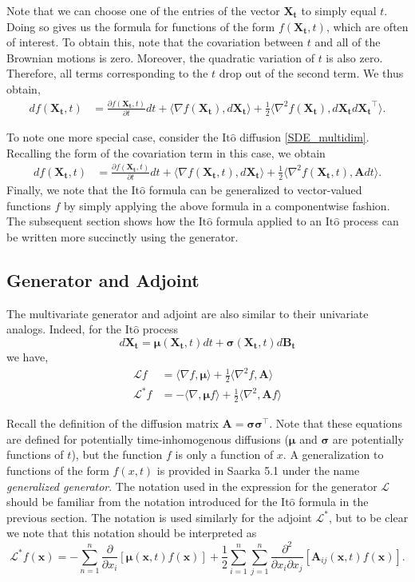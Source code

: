 \documentclass[12pt]{article}
\newcommand{\B}[1]{\boldsymbol{#1}}
\newcommand{\bx}{\mathbf{x}}
\newcommand{\state}[1][t]{X_{#1}}
\newcommand{\BM}[1][t]{B_{#1}} %
\newcommand{\gen}{\mathcal{L}} %
\newcommand{\ito}{\text{It}\hat{\text{o}}}
\newcommand{\dimState}{n}
\newcommand{\diffMat}{\mathbf{A}} %
\begin{document}
Note that we can choose one of the entries of the vector $\B\state$ to simply equal $t$. Doing so gives us the formula for functions of the form $f(\B\state, t)$, which are 
often of interest. To obtain this, note that the covariation between $t$ and all of the Brownian motions is zero. Moreover, the quadratic variation of $t$ is also zero. Therefore, 
all terms corresponding to the $t$ drop out of the second term. We thus obtain, 
\begin{align*}
df(\B\state, t) &= \frac{\partial f(\B\state,t)}{\partial t}dt  + \langle \nabla f(\B\state), d\B\state \rangle + \frac{1}{2} \langle \nabla^2 f(\B\state), d\B\state d\B\state^\top  \rangle.
\end{align*}

To note one more special case, consider the $\ito$ diffusion \ref{SDE_multidim}. Recalling the form of the covariation term in this case, we obtain 
\begin{align*}
df(\B\state, t) &= \frac{\partial f(\B\state,t)}{\partial t}dt + \langle \nabla f(\B\state,t), d\B\state \rangle + \frac{1}{2} \langle \nabla^2 f(\B\state,t), \diffMat dt  \rangle.
\end{align*}
Finally, we note that the $\ito$ formula can be generalized to vector-valued functions $f$ by simply applying the above formula in a componentwise fashion. The subsequent 
section shows how the $\ito$ formula applied to an $\ito$ process can be written more succinctly using the generator. 

\subsection{Generator and Adjoint}
The multivariate generator and adjoint are also similar to their univariate analogs. Indeed, for the $\ito$ process 
\[
d\B\state = \B\mu(\B\state,t) dt + \B\sigma(\B\state,t) d\B\BM
\]
we have,
\begin{align*}
\gen f &= \langle \nabla f, \B\mu \rangle + \frac{1}{2} \langle \nabla^2 f, \diffMat \rangle \\
\gen^* f &= -\langle \nabla, \B\mu f \rangle + \frac{1}{2} \langle \nabla^2, \diffMat f\rangle
\end{align*}

Recall the definition of the diffusion matrix $\diffMat = \B\sigma \B\sigma^\top$. Note that these equations are defined for potentially time-inhomogenous diffusions 
($\B\mu$ and $\B\sigma$ are potentially functions of $t$), but the function $f$ is only a function of $x$. A generalization to functions of the form 
$f(x,t)$ is provided in Saarka 5.1 under the name \textit{generalized generator}. The notation used in the expression for the generator $\gen$ should be familiar from 
the notation introduced for the $\ito$ formula in the previous section. The notation is used similarly for the adjoint $\gen^*$, but to be clear we note that this notation 
should be interpreted as 
\[
\gen^* f(\B{x}) = -\sum_{n=1}^{\dimState} \frac{\partial}{\partial x_i}\left[\B\mu(\B{x},t)f(\B{x}) \right] + \frac{1}{2} \sum_{i=1}^{\dimState}\sum_{j=1}^{\dimState} \frac{\partial^2}{\partial x_i \partial x_j}\left[\diffMat_{ij}(\bx,t)f(\bx) \right].
\]
\end{document}
